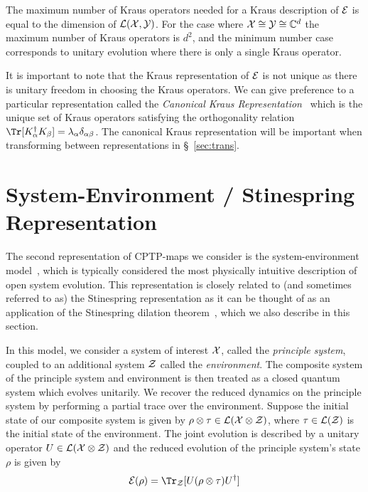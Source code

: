 The maximum number of Kraus operators needed for a Kraus description of ${\cal E}$ is equal to the dimension of ${\mathcal L}({\cal X},{\cal Y})$. For the case where ${\cal X}\cong{\cal Y}\cong{\mathbb C}^d$ the maximum number of Kraus operators is $d^2$, and the minimum number case corresponds to unitary evolution where there is only a single Kraus operator.

It is important to note that the Kraus representation of ${\cal E}$ is not unique as there is unitary freedom in choosing the Kraus operators. We can give preference to a particular representation called the \emph{Canonical Kraus Representation}~\cite{Bengtsson2006} which is the unique set of Kraus operators satisfying the orthogonality relation $\Tr[K^\dagger_\alpha K_\beta]=\lambda_\alpha\delta_{\alpha\beta}$. The canonical Kraus representation will be important when transforming between representations in \S~\ref{sec:trans}.


\section{System-Environment / Stinespring Representation}
\label{sec:se}

The second representation of CPTP-maps we consider is the system-environment model~\cite{NC}, which is typically considered the most physically intuitive description of open system evolution. This representation is closely related to (and sometimes referred to as) the Stinespring representation as it can be thought of as an application of the Stinespring dilation theorem~\cite{Stinespring1955}, which we also describe in this section.
\begin{theorem}
In this model, we consider a system of interest ${\cal X}$, called the \emph{principle system}, coupled to an additional system ${\cal Z}$ called the \emph{environment}. The composite system of the principle system and environment is then treated as a closed quantum system which evolves unitarily. We recover the reduced dynamics on the principle system by performing a partial trace over the environment. Suppose the initial state of our composite system is given by $\rho\otimes\tau \in {\mathcal L}({\cal X}\otimes{\cal Z})$, where $\tau\in {\mathcal L}({\cal Z})$ is the initial state of the environment. The joint evolution is described by a unitary operator $U\in {\mathcal L}({\cal X}\otimes{\cal Z})$ and the reduced evolution of the principle system's state $\rho$ is given by
\begin{equation}
\2 E(\rho) = \Tr_{\2 Z}[U(\rho\otimes\tau)U^\dagger]
\label{eqn:sys-env}
\end{equation}
\end{theorem}

